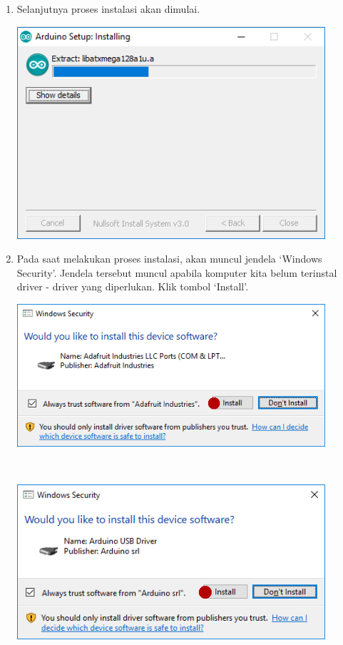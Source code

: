 \begin{enumerate}
\item Selanjutnya proses instalasi akan dimulai.
\break\\
\centerline{\includegraphics[width=0.9\textwidth]{figures/aride4.png}}
\item Pada saat melakukan proses instalasi, akan muncul jendela `Windows Security'. Jendela tersebut muncul apabila komputer kita belum terinstal driver - driver yang diperlukan. Klik tombol `Install'.
\break\\
\centerline{\includegraphics[width=0.9\textwidth]{figures/aride5.png}}
\break\\
\centerline{\includegraphics[width=0.9\textwidth]{figures/aride6.png}}

\end{enumerate}
